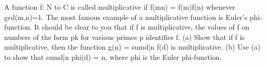 A function f: N to C is called multiplicative if f(mn) = f(m)f(n) whenever gcd(m,n)=1. The most famous example of a multiplicative function is Euler's phi-function. It should be clear to you that if f is multiplicative, the values of f on numbers of the form pk for various primes p identifies f. 
(a) Show that if f is multiplicative, then the function g(n) = sumd|n f(d) is multiplicative. 
(b) Use (a) to show that sumd|n phi(d) = n, where phi is the Euler phi-function. 
